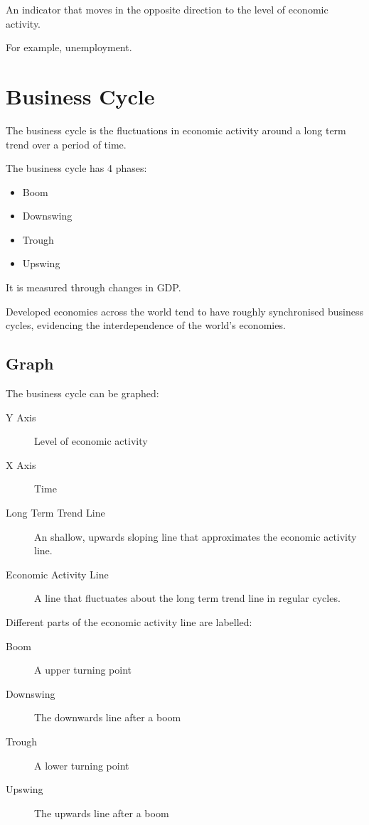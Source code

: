 \documentclass[a4paper,11pt]{article}
\begin{document}
An indicator that moves in the opposite direction to the level of economic
activity.

For example, unemployment.




\section{Business Cycle}

The business cycle is the fluctuations in economic activity around a long term
trend over a period of time.

The business cycle has 4 phases:

\begin{itemize}
\item Boom
\item Downswing
\item Trough
\item Upswing
\end{itemize}

It is measured through changes in GDP.

Developed economies across the world tend to have roughly synchronised business
cycles, evidencing the interdependence of the world's economies.


\subsection{Graph}

The business cycle can be graphed:

\begin{description}
\item [Y Axis] Level of economic activity
\item [X Axis] Time
\item [Long Term Trend Line] An shallow, upwards sloping line that approximates
	the economic activity line.
\item [Economic Activity Line] A line that fluctuates about the long term trend
	line in regular cycles.
\end{description}

Different parts of the economic activity line are labelled:

\begin{description}
\item [Boom] A upper turning point
\item [Downswing] The downwards line after a boom
\item [Trough] A lower turning point
\item [Upswing] The upwards line after a boom
\end{description}
\end{document}

